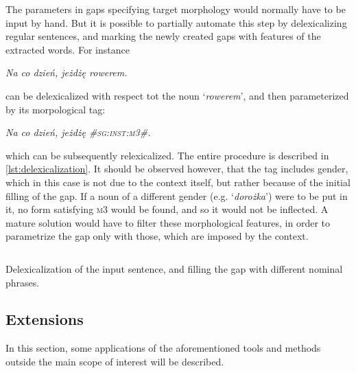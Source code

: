 \documentclass[12pt]{article}
\newcommand{\gloss}[1]{\vspace{10pt}\indent\textit{#1}\vspace{5pt}}
\newcommand{\inlinegloss}[1]{`\textit{#1}'}
\begin{document}
The parameters in gaps specifying target morphology would normally have to be input by hand. But it is possible to partially automate this step by delexicalizing regular sentences, and marking the newly created gaps with features of the extracted words. For instance

\gloss{Na co dzień, jeżdżę rowerem.}

\noindent can be delexicalized with respect tot the noun \inlinegloss{rowerem}, and then parameterized by its morpological tag:

\gloss{Na co dzień, jeżdżę \textsc{\#sg:inst:m3\#}.}

\noindent which can be subsequently relexicalized. The entire procedure is described in \autoref{lst:delexicalization}. It should be observed however, that the tag includes gender, which in this case is not due to the context itself, but rather because of the initial filling of the gap. If a noun of a different gender (e.g. \inlinegloss{dorożka}) were to be put in it, no form satisfying \textsc{m3} would be found, and so it would not be inflected. A mature solution would have to filter these morphological features, in order to parametrize the gap only with those, which are imposed by the context.

\begin{listing}[htbp]
\footnotesize
\inputminted[linenos,tabsize=2,breaklines]{Python}{delexicalization_snippet.py}
\caption{Delexicalization of the input sentence, and filling the gap with different nominal phrases.}
\label{lst:delexicalization}
\end{listing}

\subsection{Extensions}
In this section, some applications of the aforementioned tools and methods outside the main scope of interest will be described.
\end{document}
